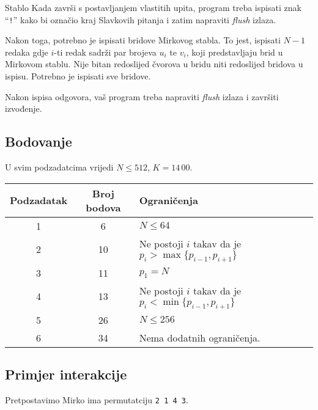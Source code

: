 \begin{statement}[
  problempoints=100,
  timelimit=1 sekunda,
  memorylimit=512 MiB,
]{Stablo}
Kada završi s postavljanjem vlastitih upita, program treba ispisati znak ``\texttt{!}'' kako bi označio kraj Slavkovih pitanja i zatim napraviti \textit{flush} izlaza.

Nakon toga, potrebno je ispisati bridove Mirkovog stabla. To jest, ispisati $N - 1$ redaka gdje $i$-ti redak sadrži par brojeva $u_i$ te $v_i$, koji predstavljaju brid u Mirkovom stablu. Nije bitan redoslijed čvorova u bridu niti redoslijed bridova u ispisu. Potrebno je ispisati sve bridove.

Nakon ispisa odgovora, vaš program treba napraviti \textit{flush} izlaza i završiti izvođenje.

\subsection*{Bodovanje}

U svim podzadatcima vrijedi $N \leq 512$, $K = 14\,00$.

{\renewcommand{\arraystretch}{1.4}
  \setlength{\tabcolsep}{6pt}
  \begin{tabular}{ccl}
   Podzadatak & Broj bodova & Ograničenja \\ \midrule
   	1 & 6 & $N \leq 64$ \\
    2 & 10 & Ne postoji $i$ takav da je $p_i > \max\{p_{i - 1}, p_{i + 1}\}$ \\
    3 & 11 & $p_1 = N$ \\
    4 & 13 & Ne postoji $i$ takav da je $p_i < \min\{p_{i - 1}, p_{i + 1}\}$ \\
    5 & 26 & $N \leq 256$ \\
    6 & 34 & Nema dodatnih ograničenja. \\
\end{tabular}}

\subsection*{Primjer interakcije}

Pretpostavimo Mirko ima permutatciju \texttt{2 1 4 3}.


\end{statement}
